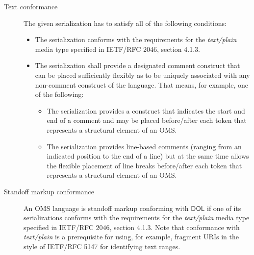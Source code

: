 \documentclass[10pt,fleqn,final]{scrreprt}
\makeatletter
\newcommand{\cbs}[0]{\color{red}\xspace} %
\newcommand{\cbe}[0]{\color{black}\xspace} %
\newcommand*\CommentAuthor{}
\renewcommand*\CommentAuthor{#1}}
\newcommand*\CommentDate{}
\renewcommand*\CommentDate{#1}}
\newcommand*\CommentId{}
\renewcommand*\CommentId{#1}}
\newcommand*\CommentType{}
\renewcommand*\CommentType{#1}}
\newcommand*{\SetCommentColorByType}[1]{%
\edef\localType{{#1}}%
\expandafter\ifstrequal\localType{q-aut}{\colorlet{CommentColor}{red}}{%
\expandafter\ifstrequal\localType{q-all}{\colorlet{CommentColor}{orange}}{%
\expandafter\ifstrequal\localType{todo}{\colorlet{CommentColor}{orange}}{%
\expandafter\ifstrequal\localType{fyi}{\colorlet{CommentColor}{lightgray}}{%
\colorlet{CommentColor}{yellow}}}}}}
\newcommand*{\SetCommentPrefixByType}[1]{%
\edef\localType{{#1}}%
\expandafter\@ifmtarg\localType{%
\edef\CommentPrefix{}%
}{%
\caseupper[q]{#1}%
\edef\CommentPrefix{\thestring: }%
}}
\newcommand*{\initComment}[1]{%
\setkeys{Comment}{#1}%
\SetCommentColorByType{\CommentType}%
\relax%
\SetCommentPrefixByType{\CommentType}%
\relax%
}
\newcommand*{\todonote}[2][]{%
\initComment{#1}%
\pdfcomment[author=\CommentAuthor,color=CommentColor,date=\CommentDate,id=\CommentId]{%
\CommentPrefix
#2}}
\renewcommand*{\todonote}[2][]{%
\initComment{#1}%
\ednote{\CommentPrefix #2}}
\newcommand*{\mimetype}[1]{\textit{#1}}
\newcommand*{\DOL}{\ensuremath{\mathsf{DOL}}\xspace}
\newcommand{\nisref}[1]{#1}
\makeatother
\begin{document}
\begin{description}
\item[Text conformance]
The given serialization has to satisfy all of the following conditions:
\begin{itemize}
\item The serialization conforms with the requirements for the \mimetype{text/plain} media type specified in \nisref{IETF/RFC 2046}, section 4.1.3.
\item The serialization shall provide a designated comment construct that can be placed sufficiently\cbs flexibly\cbe as to be uniquely associated with any non-comment construct of the language.  That means, for example, one of the following:
  \begin{itemize}
  \item The serialization provides a construct that indicates the start and end of a comment and may be placed before/after each token that represents a structural element of an OMS.
  \item The serialization provides line-based comments (ranging from an indicated position to the end of a line) but at the same time allows the flexible placement of line breaks before/after each token that represents a structural element of an OMS.
  \end{itemize}
\end{itemize}

\item[Standoff markup conformance]
An OMS language is standoff markup conforming with \DOL if one of its serializations conforms with
the requirements for the \mimetype{text/plain} media type specified in \nisref{IETF/RFC 2046},
section 4.1.3.  Note that conformance with \mimetype{text/plain} is a prerequisite for using, for
example, fragment URIs in the style of \nisref{IETF/RFC 5147} for identifying text ranges.
\end{description}

\end{document}
